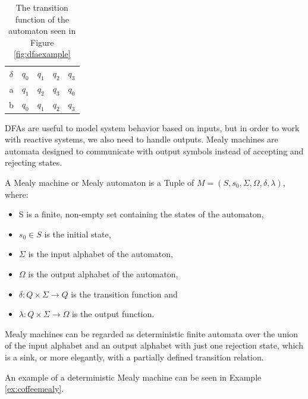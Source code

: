 \begin{table}[!ht]
	\centering
	\begin{tabular}{|c|cccc|}
		\hline
		$\delta$ & $q_0$ & $q_1$ & $q_2$ & $q_3$\\ \cline{1-5}
		a & $q_1$ & $q_2$ & $q_3$ & $q_0$ \\	
		b & $q_0$ & $q_1$ & $q_2$ & $q_3$ \\	\hline
	\end{tabular}
	\caption{The transition function of the automaton seen in Figure \ref{fig:dfaexample}}
	\label{tab:dfaexampledelta}
\end{table}

DFAs are useful to model system behavior based on inputs, but in order to work with reactive systems, we also need to handle outputs. Mealy machines are automata designed to communicate with output symbols instead of accepting and rejecting states.


\begin{definition}
	A Mealy machine or Mealy automaton is a Tuple of $ M=(S,s_{0},\Sigma,\Omega,\delta,\lambda) $, where:
	\begin{itemize}
		\item S is a finite, non-empty set containing the states of the automaton,
		\item $s_{0} \in S$ is the initial state,
		\item $\Sigma$ is the input alphabet of the automaton,
		\item $\Omega$ is the output alphabet of the automaton,
		\item $\delta: Q\times \Sigma \to Q$ is the transition function and
		\item $\lambda: Q\times \Sigma \to \Omega$ is the output function. 
	\end{itemize}
\end{definition}

Mealy machines can be regarded as deterministic finite automata over the union of the input alphabet and an output alphabet with just one rejection state, which is a sink, or more elegantly, with a partially defined transition relation.\cite{Steffen2011}

An example of a deterministic Mealy machine can be seen in Example \ref{ex:coffeemealy}.

